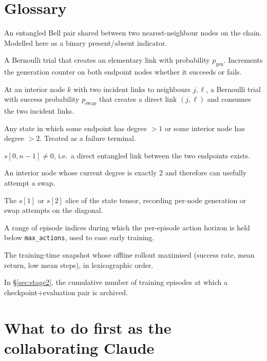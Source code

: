 \documentclass[11pt]{article}
\newcommand{\code}[1]{\texttt{#1}}
\newcommand{\pgen}{p_{\text{gen}}}
\newcommand{\pswap}{p_{\text{swap}}}
\begin{document}
\section{Glossary}
\label{sec:glossary}

\begin{description}[leftmargin=2em,style=nextline]
  \item[Elementary link] An entangled Bell pair shared between two nearest-neighbour nodes on the chain. Modelled here as a binary present/absent indicator.
  \item[Generation attempt] A Bernoulli trial that creates an elementary link with probability $\pgen$. Increments the generation counter on both endpoint nodes whether it succeeds or fails.
  \item[Swap attempt] At an interior node $k$ with two incident links to neighbours $j,\ell$, a Bernoulli trial with success probability $\pswap$ that creates a direct link $(j,\ell)$ and consumes the two incident links.
  \item[Bad state] Any state in which some endpoint has degree $>1$ or some interior node has degree $>2$. Treated as a failure terminal.
  \item[Final state] $s[0,n-1] \ne 0$, i.e.\ a direct entangled link between the two endpoints exists.
  \item[Swap-ready node] An interior node whose current degree is exactly 2 and therefore can usefully attempt a swap.
  \item[Counter channel] The $s[1]$ or $s[2]$ slice of the state tensor, recording per-node generation or swap attempts on the diagonal.
  \item[Curriculum phase] A range of episode indices during which the per-episode action horizon is held below \code{max\_actions}, used to ease early training.
  \item[Best-eval checkpoint] The training-time snapshot whose offline rollout maximised (success rate, mean return, low mean steps), in lexicographic order.
  \item[Budget] In \S\ref{sec:stage2}, the cumulative number of training episodes at which a checkpoint+evaluation pair is archived.
\end{description}

\section{What to do first as the collaborating Claude}
\label{sec:tldr}
\end{document}
